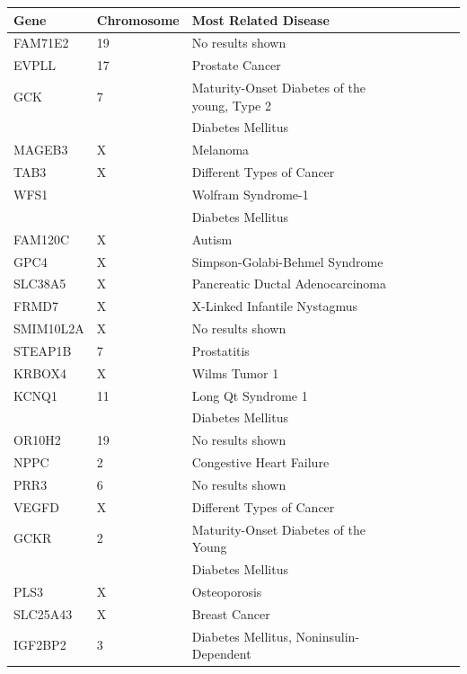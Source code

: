 \begin{table}[h]
	\begin{tabular}{|l|l|l|>{\centering}p{.9cm}|>{\centering}p{.9cm}|>{\centering}p{.9cm}|l|}
		\hline
		Gene          & Chromosome & Most Related Disease               \\ \hline
		FAM71E2       & 19 & No results shown    \\ \hline
		EVPLL         & 17 & Prostate Cancer  \\ \hline
		GCK			  & 7  & Maturity-Onset Diabetes of the young, Type 2 \\ 	
		        	  &    & Diabetes Mellitus  \\ \hline
		MAGEB3		  & X  & Melanoma   \\ \hline
		TAB3   		  & X  & Different Types of Cancer \\ \hline
		WFS1   		  &    & Wolfram Syndrome-1\\ 
					  &    & Diabetes Mellitus \\ \hline
		FAM120C   	  &	X  & Autism \\ \hline
		GPC4  		  &	X  & Simpson-Golabi-Behmel Syndrome\\ \hline
		SLC38A5  	  & X  & Pancreatic Ductal Adenocarcinoma\\ \hline
		FRMD7	  	  & X  & X-Linked Infantile Nystagmus\\ \hline
		SMIM10L2A  	  & X  & No results shown\\ \hline
		STEAP1B		  & 7  & Prostatitis \\ \hline
		KRBOX4		  & X  & Wilms Tumor 1 \\ \hline	
		KCNQ1		  & 11 & Long Qt Syndrome 1 \\
					  &    & Diabetes Mellitus \\ \hline	
		OR10H2		  & 19 & No results shown \\ \hline	
		NPPC		  & 2  & Congestive Heart Failure \\ \hline	
		PRR3		  & 6  & No results shown \\ \hline	
		VEGFD		  & X  & Different Types of Cancer \\ \hline	
		GCKR		  & 2  & Maturity-Onset Diabetes of the Young \\
					  &    & Diabetes Mellitus \\ \hline
		PLS3		  & X  & Osteoporosis \\ \hline	
		SLC25A43	  & X  & Breast Cancer \\ \hline	
		IGF2BP2		  & 3  & Diabetes Mellitus, Noninsulin-Dependent \\ \hline	

\end{tabular}
\end{table}
